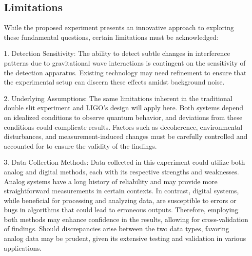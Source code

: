 \documentclass{article}
\begin{document}
\subsection{Limitations}
While the proposed experiment presents an innovative approach to exploring these fundamental questions, certain limitations must be acknowledged:

1. Detection Sensitivity: The ability to detect subtle changes in interference patterns due to gravitational wave interactions is contingent on the sensitivity of the detection apparatus. Existing technology may need refinement to ensure that the experimental setup can discern these effects amidst background noise.

2. Underlying Assumptions: The same limitations inherent in the traditional double slit experiment and LIGO's design will apply here. Both systems depend on idealized conditions to observe quantum behavior, and deviations from these conditions could complicate results. Factors such as decoherence, environmental disturbances, and measurement-induced changes must be carefully controlled and accounted for to ensure the validity of the findings.

3. Data Collection Methods: Data collected in this experiment could utilize both analog and digital methods, each with its respective strengths and weaknesses. Analog systems have a long history of reliability and may provide more straightforward measurements in certain contexts. In contrast, digital systems, while beneficial for processing and analyzing data, are susceptible to errors or bugs in algorithms that could lead to erroneous outputs. Therefore, employing both methods may enhance confidence in the results, allowing for cross-validation of findings. Should discrepancies arise between the two data types, favoring analog data may be prudent, given its extensive testing and validation in various applications.



\end{document}
